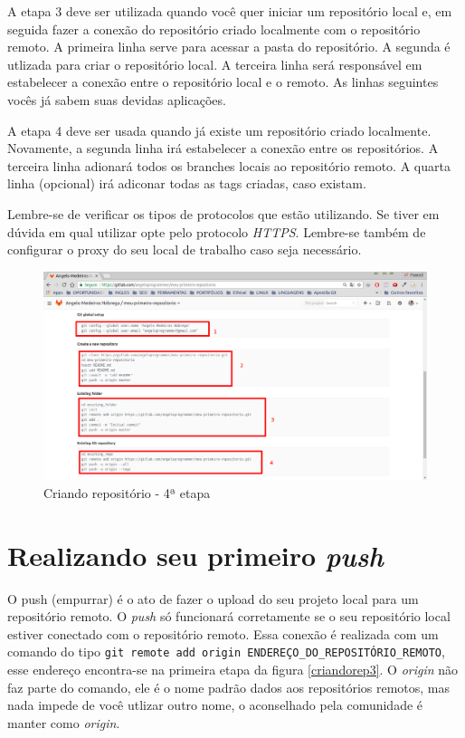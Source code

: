 \documentclass[12pt,openright,oneside,a4paper,english,brazil]{abntex2}
\begin{document}
A etapa 3 deve ser utilizada quando você quer iniciar um repositório local e, em seguida fazer a conexão do repositório criado localmente com o repositório remoto. A primeira linha serve para acessar a pasta do repositório. A segunda é utlizada para criar o repositório local. A terceira linha será responsável em estabelecer a conexão entre o repositório local e o remoto. As linhas seguintes vocês já sabem suas devidas aplicações.

A etapa 4 deve ser usada quando já existe um repositório criado localmente. Novamente, a segunda linha irá estabelecer a conexão entre os repositórios. A terceira linha adionará todos os branches locais ao repositório remoto. A quarta linha (opcional) irá adiconar todas as tags criadas, caso existam.

Lembre-se de verificar os tipos de protocolos que estão utilizando. Se tiver em dúvida em qual utilizar opte pelo protocolo \textit{HTTPS}. Lembre-se também de configurar o proxy do seu local de trabalho caso seja necessário.

\begin{figure}[h]
	\caption{\label{criandorep4}Criando repositório - 4ª etapa}
	\begin{center}
		\includegraphics[width=1\linewidth]{imagens/criandorep4}
	\end{center}
\end{figure}

\section{Realizando seu primeiro \textit{push}}

O push (empurrar) é o ato de fazer o upload do seu projeto local para um repositório remoto. O \textit{push} só funcionará corretamente se o seu repositório local estiver conectado com o repositório remoto. Essa conexão é realizada com um comando do tipo \verb|git remote add origin ENDEREÇO_DO_REPOSITÓRIO_REMOTO|, esse endereço encontra-se na primeira etapa da figura \ref{criandorep3}. O \textit{origin} não faz parte do comando, ele é o nome padrão dados aos repositórios remotos, mas nada impede de você utlizar outro nome, o aconselhado pela comunidade é manter como \textit{origin}.
\end{document}
